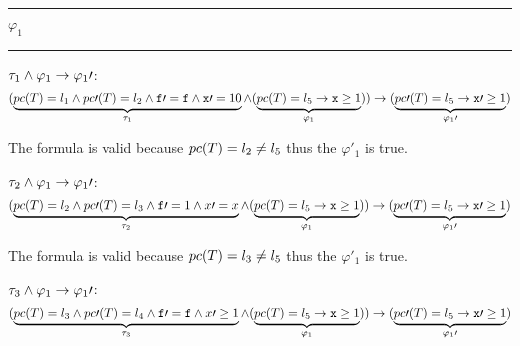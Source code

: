 \begin{center}\rule{4cm}{0.4pt}  $\varphi_1$  \rule{4cm}{0.4pt}\end{center}
	
	 $\tau_1 \wedge \varphi_1 \to \varphi_1\prime $:
	\begin{equation*}
		(
			\underbrace{pc(T) = l_1 \wedge pc\prime (T) = l_2 \wedge \mathtt{f\prime =f} \wedge \mathtt{x}\prime  = 10}_{\tau_1} \wedge (\underbrace{pc(T) = l_5 \to \mathtt{x}\geq 1}_{\varphi_1})
		) 
				\to(\underbrace{pc\prime (T) = l_5 \to \mathtt{x}\prime  \geq 1}_{\varphi_1\prime })\\\\
	\end{equation*}


	The formula is valid because $pc(T) = l_2 \neq l_5$ thus the $\varphi\prime _1$ is true.

	 $\tau_2 \wedge \varphi_1 \to \varphi_1\prime $:
	\begin{equation*}
		(
			\underbrace{pc(T) = l_2 \wedge pc\prime (T) = l_3 \wedge \mathtt{f}\prime  = 1 \wedge x\prime =x}_{\tau_2} \wedge (\underbrace{pc(T) = l_5 \to \mathtt{x}\geq 1}_{\varphi_1})
		) 
			\to(\underbrace{pc\prime (T) = l_5 \to \mathtt{x}\prime  \geq 1}_{\varphi_1\prime })\\\\
	\end{equation*}


	The formula is valid because $pc(T) = l_3 \neq l_5$ thus the $\varphi\prime _1$ is true.

	 $\tau_3 \wedge \varphi_1 \to \varphi_1\prime $:
	\begin{equation*}
		(
			\underbrace{pc(T) = l_3 \wedge pc\prime (T) = l_4 \wedge \mathtt{f\prime =f} \wedge x\prime \geq 1}_{\tau_3} \wedge (\underbrace{pc(T) = l_5 \to \mathtt{x}\geq 1}_{\varphi_1})
		) 
			\to(\underbrace{pc\prime (T) = l_5 \to \mathtt{x}\prime  \geq 1}_{\varphi_1\prime })\\\\
	\end{equation*}


